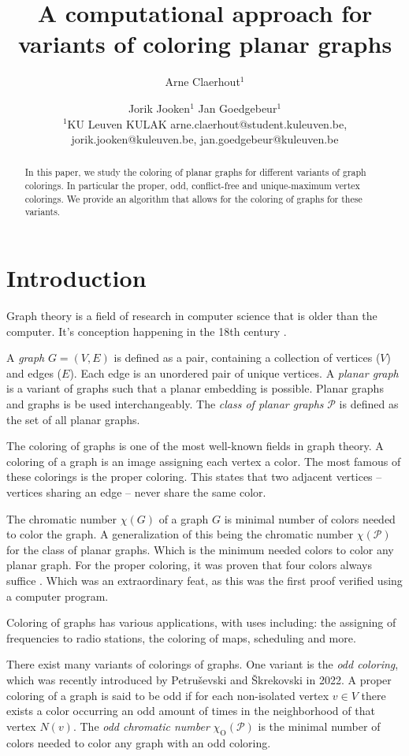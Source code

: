 \documentclass{article}
\title{A computational approach for variants of coloring planar graphs}
\author{
Arne Claerhout$^1$\and
Jorik Jooken$^1$\And
Jan Goedgebeur$^1$\\
\affiliations
$^1$KU Leuven KULAK
\emails
arne.claerhout@student.kuleuven.be,
jorik.jooken@kuleuven.be,
jan.goedgebeur@kuleuven.be
}
\begin{document}
\maketitle

\begin{abstract}
	In this paper, we study the coloring of planar graphs for different variants of graph colorings. In particular the proper, odd, conflict-free and unique-maximum vertex colorings. We provide an algorithm that allows for the coloring of graphs for these variants.
\end{abstract}

\section{Introduction}

Graph theory is a field of research in computer science that is older than the computer. It's conception happening in the 18th century \cite{euler1741solutio}. 

A \textit{graph} $G = (V, E)$ is defined as a pair, containing a collection of vertices ($V$) and edges ($E$). Each edge is an unordered pair of unique vertices. A \textit{planar graph} is a variant of graphs such that a planar embedding is possible. Planar graphs and graphs is be used interchangeably. The \textit{class of planar graphs} $\mathcal{P}$ is defined as the set of all planar graphs.

The coloring of graphs is one of the most well-known fields in graph theory. A coloring of a graph is an image assigning each vertex a color. The most famous of these colorings is the proper coloring. This states that two adjacent vertices -- vertices sharing an edge -- never share the same color. 

The chromatic number $\chi(G)$ of a graph $G$ is minimal number of colors needed to color the graph. A generalization of this being the chromatic number $\chi(\mathcal{P})$ for the class of planar graphs. Which is the minimum needed colors to color any planar graph. For the proper coloring, it was proven that four colors always suffice \cite{appel1976every}. Which was an extraordinary feat, as this was the first proof verified using a computer program.

Coloring of graphs has various applications, with uses including: the assigning of frequencies to radio stations, the coloring of maps, scheduling and more.

There exist many variants of colorings of graphs. One variant is the \textit{odd coloring}, which was recently introduced by Petruševski and Škrekovski \cite{PETRUSEVSKI2022385} in 2022. A proper coloring of a graph is said to be odd if for each non-isolated vertex $v \in V$ there exists a color occurring an odd amount of times in the neighborhood of that vertex $N(v)$. The \textit{odd chromatic number} $\chi_{\mathrm{O}}(\mathcal{P})$ is the minimal number of colors needed to color any graph with an odd coloring.
\end{document}
